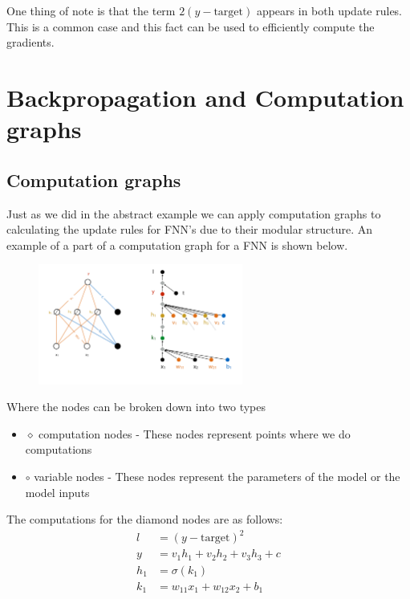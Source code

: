 \documentclass[12pt]{article}
\begin{document}
One thing of note is that the term $2(y - \text{target})$ appears in both update rules. This is a common case and this fact can be used to efficiently compute the gradients.

\newpage

\section{Backpropagation and Computation graphs}

\subsection{Computation graphs}

Just as we did in the abstract example we can apply computation graphs to calculating the update rules for FNN's due to their modular structure. An example of a part of a computation graph for a FNN is shown below.

\begin{figure}[!h]
    \centering
    \includegraphics[width=0.6\textwidth]{assets/FNNcompgraph.png}
\end{figure}

Where the nodes can be broken down into two types 
\begin{itemize}[leftmargin=*, noitemsep]
    \item $\diamond$ computation nodes - These nodes represent points where we do computations
    \item $\circ$ variable nodes - These nodes represent the parameters of the model or the model inputs
\end{itemize}

The computations for the diamond nodes are as follows: 
\begin{align*}
    l & = (y - \text{target})^2 \\
    y & = v_1h_1 + v_2h_2 + v_3h_3 + c \\
    h_1 & = \sigma(k_1) \\
    k_1 & = w_{11}x_1 + w_{12}x_2 + b_1
\end{align*}
\end{document}
